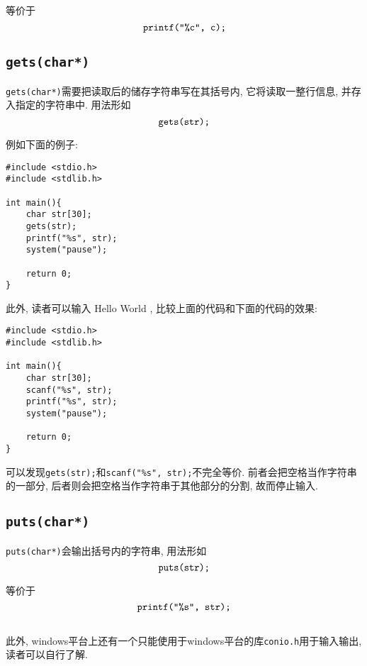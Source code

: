             等价于
                \[ \mbox{\texttt{printf("\%c", c);}} \]

        \subsection*{\texttt{gets(char*)}}
            \texttt{gets(char*)}需要把读取后的储存字符串写在其括号内, 它将读取一整行信息, 并存入指定的字符串中. 用法形如
                \[ \mbox{\texttt{gets(str);}} \]

            例如下面的例子:
\begin{lstlisting}
#include <stdio.h>
#include <stdlib.h>

int main(){
    char str[30];
    gets(str);
    printf("%s", str);
    system("pause");

    return 0;
}
\end{lstlisting}

            此外, 读者可以输入 Hello World , 比较上面的代码和下面的代码的效果:
\begin{lstlisting}
#include <stdio.h>
#include <stdlib.h>

int main(){
    char str[30];
    scanf("%s", str);
    printf("%s", str);
    system("pause");

    return 0;
}
\end{lstlisting}

            可以发现\texttt{gets(str);}和\texttt{scanf("\%s", str);}不完全等价. 前者会把空格当作字符串的一部分, 后者则会把空格当作字符串于其他部分的分割, 故而停止输入.

        \subsection*{\texttt{puts(char*)}}
            \texttt{puts(char*)}会输出括号内的字符串, 用法形如
                \[ \mbox{\texttt{puts(str);}} \]

            等价于
                \[ \mbox{\texttt{printf("\%s", str);}} \]

        \subsection*{ }
        此外, windows平台上还有一个只能使用于windows平台的库\texttt{conio.h}用于输入输出, 读者可以自行了解.